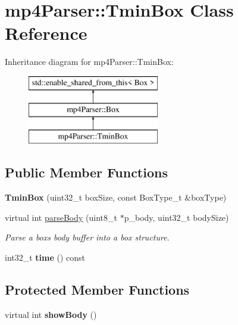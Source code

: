 \hypertarget{classmp4_parser_1_1_tmin_box}{}\section{mp4\+Parser\+::Tmin\+Box Class Reference}
\label{classmp4_parser_1_1_tmin_box}
Inheritance diagram for mp4\+Parser\+::Tmin\+Box\+:\begin{figure}[H]
\begin{center}
\leavevmode
\includegraphics[height=3.000000cm]{classmp4_parser_1_1_tmin_box}
\end{center}
\end{figure}
\subsection*{Public Member Functions}
\begin{DoxyCompactItemize}
\item 
\mbox{\label{classmp4_parser_1_1_tmin_box_a25b0f4a841a48c36ff7ada5fc2c55816}} 
{\bfseries Tmin\+Box} (uint32\+\_\+t box\+Size, const Box\+Type\+\_\+t \&box\+Type)
\item 
virtual int \mbox{\hyperlink{classmp4_parser_1_1_tmin_box_aa6acc0171e81391f83a7ef00e89d617d}{parse\+Body}} (uint8\+\_\+t $\ast$p\+\_\+body, uint32\+\_\+t body\+Size)
\begin{DoxyCompactList}\small\item\em Parse a box\textquotesingle{}s body buffer into a box structure. \end{DoxyCompactList}\item 
\mbox{\label{classmp4_parser_1_1_tmin_box_afca8f9f2dfc0e50a489e0be1e693fe95}} 
int32\+\_\+t {\bfseries time} () const
\end{DoxyCompactItemize}
\subsection*{Protected Member Functions}
\begin{DoxyCompactItemize}
\item 
\mbox{\label{classmp4_parser_1_1_tmin_box_a323f7e49dc660b3d16c3d4ab3f91160c}} 
virtual int {\bfseries show\+Body} ()
\end{DoxyCompactItemize}
